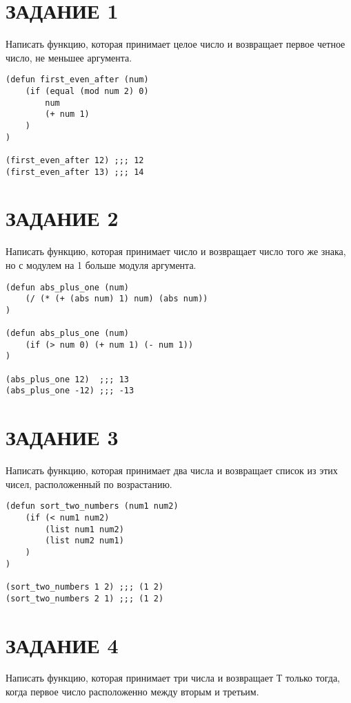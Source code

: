 \section{ЗАДАНИЕ 1}

Написать функцию, которая принимает целое число и возвращает первое
четное число, не меньшее аргумента.

\begin{lstlisting}
(defun first_even_after (num)
    (if (equal (mod num 2) 0)
        num
        (+ num 1)
    )
)

(first_even_after 12) ;;; 12
(first_even_after 13) ;;; 14
\end{lstlisting}

\section{ЗАДАНИЕ 2}

Написать функцию, которая принимает число и возвращает число
того же знака, но с модулем на 1 больше модуля аргумента.

\begin{lstlisting}
(defun abs_plus_one (num)
    (/ (* (+ (abs num) 1) num) (abs num))
)

(defun abs_plus_one (num)
    (if (> num 0) (+ num 1) (- num 1))
)

(abs_plus_one 12)  ;;; 13
(abs_plus_one -12) ;;; -13
\end{lstlisting}

\section{ЗАДАНИЕ 3}

Написать функцию, которая принимает два числа и возвращает
список из этих чисел, расположенный по возрастанию.

\begin{lstlisting}
(defun sort_two_numbers (num1 num2)
    (if (< num1 num2)
        (list num1 num2)
        (list num2 num1)
    )
)

(sort_two_numbers 1 2) ;;; (1 2)
(sort_two_numbers 2 1) ;;; (1 2)
\end{lstlisting}

\section{ЗАДАНИЕ 4}

Написать функцию, которая принимает три числа и возвращает Т только
тогда, когда первое число расположенно между вторым и третьим.

